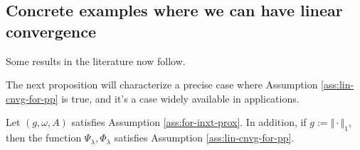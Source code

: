 \documentclass[12pt]{article}
\begin{document}
    \subsection{Concrete examples where we can have linear convergence}
        Some results in the literature now follow.  
        \begin{definition}
            
        \end{definition}
        \begin{definition}
            
        \end{definition}
        \begin{fact}
            
        \end{fact}
        \begin{fact}
            
        \end{fact}
        \begin{fact}
            
        \end{fact}
        The next proposition will characterize a precise case where Assumption \ref{ass:lin-cnvg-for-pp} is true, and it's a case widely available in applications. 
        \begin{proposition}\label{prop:1nrm-prox-problem}
            Let $(g, \omega, A)$ satisfies Assumption \ref{ass:for-inxt-prox}. 
            In addition, if $g := \Vert \cdot\Vert_1$, then the function $\Psi_\lambda, \Phi_\lambda$ satisfies Assumption \ref{ass:lin-cnvg-for-pp}. 
        \end{proposition}
\end{document}
